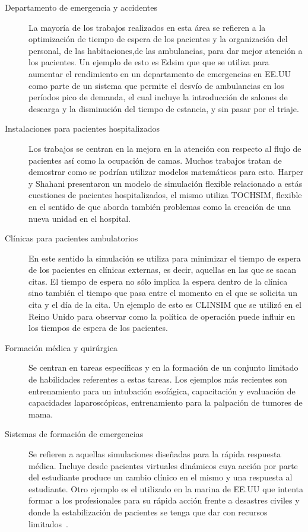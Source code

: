 \begin{description}

\item[Departamento de emergencia y accidentes] La mayoría de los trabajos
	realizados en esta área se refieren a la optimización de tiempo de
	espera de los pacientes y la organización del personal, de las
	habitaciones,de las ambulancias, para dar mejor atención a los
	pacientes. 
	Un ejemplo de esto es Edsim que que se utiliza para aumentar
	el rendimiento en un departamento de emergencias en EE.UU como parte de
	un sistema que permite el desvío de ambulancias en los períodos pico de
	demanda, el cual incluye la introducción de salones de descarga y la
	disminución del tiempo de estancia, y sin pasar por el triaje\cite{guna:simulation}. 
	
\item[Instalaciones para pacientes hospitalizados] Los trabajos se centran en la
	mejora en la atención con respecto al flujo de pacientes así como la
	ocupación de camas. Muchos trabajos tratan de demostrar como se podrían
	utilizar modelos matemáticos para esto. Harper y Shahani presentaron un
	modelo de simulación flexible relacionado a estás cuestiones de
	pacientes hospitalizados, el mismo utiliza TOCHSIM, flexible en el
	sentido de que aborda también problemas como la creación de una nueva
	unidad en el hospital\cite{guna:simulation}.

\item[Clínicas para pacientes ambulatorios] En este sentido la simulación se
	utiliza para minimizar el tiempo de espera de los pacientes en clínicas
	externas, es decir, aquellas en las que se sacan citas. El tiempo de
	espera no sólo implica la espera dentro de la clínica sino también el
	tiempo que pasa entre el momento en el que se solicita un cita y el día
	de la cita. Un ejemplo de esto es CLINSIM que se utilizó en el Reino
	Unido para observar como la política de operación puede influir en los
	tiempos de espera de los pacientes\cite{guna:simulation}. 

\item[Formación médica y quirúrgica] Se centran en tareas específicas y en la
	formación de un conjunto limitado de habilidades referentes a estas
	tareas. Los ejemplos más recientes son entrenamiento para un intubación
	esofágica, capacitación y evaluación de capacidades laparoscópicas,
	entrenamiento para la palpación de tumores de mama\cite{mantovani:vr}. 

\item[Sistemas de formación de emergencias] Se refieren a aquellas simulaciones
	diseñadas para la rápida respuesta médica. Incluye desde pacientes
	virtuales dinámicos cuya acción por parte del estudiante produce un
	cambio clínico en el mismo y una respuesta al estudiante.  Otro ejemplo
	es el utilizado en la marina de EE.UU que intenta formar a los
	profesionales para su rápida acción frente a desastres civiles y donde
	la estabilización de pacientes se tenga que dar con recursos
	limitados~\cite{mantovani:vr}. 


\end{description}
